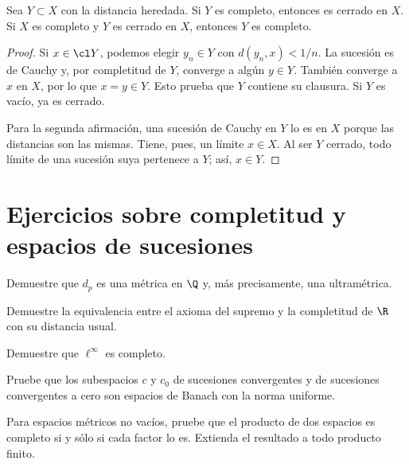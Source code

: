\begin{teorema}\label{ch08:cerrado-completo}
Sea $Y\subset X$ con la distancia heredada. Si $Y$ es completo, entonces es cerrado en $X$. Si $X$ es completo y $Y$ es cerrado en $X$, entonces $Y$ es completo.
\end{teorema}
\begin{proof}
Si $x\in\cl Y$, podemos elegir $y_n\in Y$ con $d(y_n,x)<1/n$. La sucesión es de Cauchy y, por completitud de $Y$, converge a algún $y\in Y$. También converge a $x$ en $X$, por lo que $x=y\in Y$. Esto prueba que $Y$ contiene su clausura. Si $Y$ es vacío, ya es cerrado.

Para la segunda afirmación, una sucesión de Cauchy en $Y$ lo es en $X$ porque las distancias son las mismas. Tiene, pues, un límite $x\in X$. Al ser $Y$ cerrado, todo límite de una sucesión suya pertenece a $Y$; así, $x\in Y$.
\end{proof}

\section{Ejercicios sobre completitud y espacios de sucesiones}
\begin{ejercicio}\label{ej:lectura-8-1}
Demuestre que $d_p$ es una métrica en $\Q$ y, más precisamente, una ultramétrica.
\end{ejercicio}


\begin{ejercicio}\label{ej:lectura-8-2}
Demuestre la equivalencia entre el axioma del supremo y la completitud de $\R$ con su distancia usual.
\end{ejercicio}


\begin{ejercicio}\label{ej:lectura-8-3}
Demuestre que $\ell^\infty$ es completo.
\end{ejercicio}


\begin{ejercicio}\label{ej:lectura-8-4}
Pruebe que los subespacios $c$ y $c_0$ de sucesiones convergentes y de sucesiones convergentes a cero son espacios de Banach con la norma uniforme.
\end{ejercicio}


\begin{ejercicio}\label{ej:lectura-8-5}
Para espacios métricos no vacíos, pruebe que el producto de dos espacios es completo si y sólo si cada factor lo es. Extienda el resultado a todo producto finito.
\end{ejercicio}


